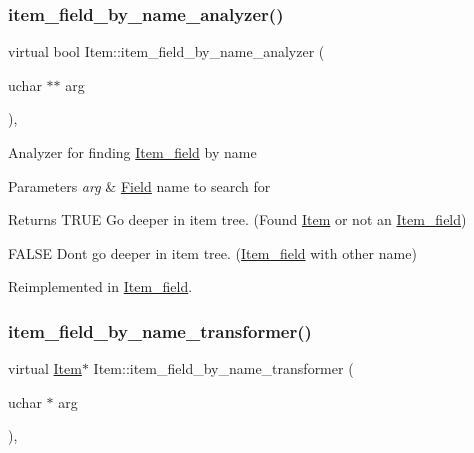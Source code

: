 \subsubsection{\texorpdfstring{item\+\_\+field\+\_\+by\+\_\+name\+\_\+analyzer()}{item\_field\_by\_name\_analyzer()}}
{\footnotesize\ttfamily virtual bool Item\+::item\+\_\+field\+\_\+by\+\_\+name\+\_\+analyzer (\begin{DoxyParamCaption}\item[{uchar $\ast$$\ast$}]{arg }\end{DoxyParamCaption})\hspace{0.3cm}{\ttfamily [inline]}, {\ttfamily [virtual]}}

Analyzer for finding \mbox{\hyperlink{classItem__field}{Item\+\_\+field}} by name


\begin{DoxyParams}{Parameters}
{\em arg} & \mbox{\hyperlink{classField}{Field}} name to search for\\
\hline
\end{DoxyParams}
\begin{DoxyReturn}{Returns}
T\+R\+UE Go deeper in item tree. (Found \mbox{\hyperlink{classItem}{Item}} or not an \mbox{\hyperlink{classItem__field}{Item\+\_\+field}}) 

F\+A\+L\+SE Don\textquotesingle{}t go deeper in item tree. (\mbox{\hyperlink{classItem__field}{Item\+\_\+field}} with other name) 
\end{DoxyReturn}


Reimplemented in \mbox{\hyperlink{classItem__field_aee675801bd0ba08e66d0210a597390de}{Item\+\_\+field}}.

\mbox{\label{classItem_ae697702435e782119336e6fc3fb6d204}} 
\subsubsection{\texorpdfstring{item\+\_\+field\+\_\+by\+\_\+name\+\_\+transformer()}{item\_field\_by\_name\_transformer()}}
{\footnotesize\ttfamily virtual \mbox{\hyperlink{classItem}{Item}}$\ast$ Item\+::item\+\_\+field\+\_\+by\+\_\+name\+\_\+transformer (\begin{DoxyParamCaption}\item[{uchar $\ast$}]{arg }\end{DoxyParamCaption})\hspace{0.3cm}{\ttfamily [inline]}, {\ttfamily [virtual]}}

